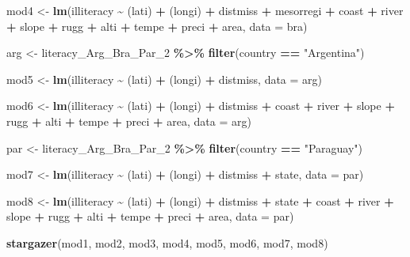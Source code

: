 \documentclass[
  a4paper,
]{article}
\newenvironment{Shaded}{\begin{snugshade}}{\end{snugshade}}
\newcommand{\AttributeTok}[1]{\textcolor[rgb]{0.13,0.29,0.53}{#1}}
\newcommand{\FunctionTok}[1]{\textcolor[rgb]{0.13,0.29,0.53}{\textbf{#1}}}
\newcommand{\NormalTok}[1]{#1}
\newcommand{\OtherTok}[1]{\textcolor[rgb]{0.56,0.35,0.01}{#1}}
\newcommand{\SpecialCharTok}[1]{\textcolor[rgb]{0.81,0.36,0.00}{\textbf{#1}}}
\newcommand{\StringTok}[1]{\textcolor[rgb]{0.31,0.60,0.02}{#1}}
\begin{document}
\begin{Shaded}
\begin{Highlighting}[]
\NormalTok{mod4 }\OtherTok{\textless{}{-}} \FunctionTok{lm}\NormalTok{(illiteracy }\SpecialCharTok{\textasciitilde{}}\NormalTok{ (lati) }\SpecialCharTok{+}\NormalTok{ (longi) }\SpecialCharTok{+}\NormalTok{ distmiss }\SpecialCharTok{+}\NormalTok{ mesorregi }\SpecialCharTok{+}\NormalTok{ coast }\SpecialCharTok{+}\NormalTok{ river }\SpecialCharTok{+}\NormalTok{ slope }\SpecialCharTok{+}\NormalTok{ rugg }\SpecialCharTok{+}\NormalTok{ alti }\SpecialCharTok{+}\NormalTok{ tempe }\SpecialCharTok{+}\NormalTok{ preci }\SpecialCharTok{+}\NormalTok{ area, }\AttributeTok{data =}\NormalTok{ bra)}


\NormalTok{arg }\OtherTok{\textless{}{-}}\NormalTok{ literacy\_Arg\_Bra\_Par\_2 }\SpecialCharTok{\%\textgreater{}\%} 
             \FunctionTok{filter}\NormalTok{(country }\SpecialCharTok{==} \StringTok{"Argentina"}\NormalTok{)}

\NormalTok{mod5 }\OtherTok{\textless{}{-}} \FunctionTok{lm}\NormalTok{(illiteracy }\SpecialCharTok{\textasciitilde{}}\NormalTok{ (lati) }\SpecialCharTok{+}\NormalTok{ (longi) }\SpecialCharTok{+}\NormalTok{ distmiss, }\AttributeTok{data =}\NormalTok{ arg)}

\NormalTok{mod6 }\OtherTok{\textless{}{-}} \FunctionTok{lm}\NormalTok{(illiteracy }\SpecialCharTok{\textasciitilde{}}\NormalTok{ (lati) }\SpecialCharTok{+}\NormalTok{ (longi) }\SpecialCharTok{+}\NormalTok{ distmiss }\SpecialCharTok{+}\NormalTok{ coast }\SpecialCharTok{+}\NormalTok{ river }\SpecialCharTok{+}\NormalTok{ slope }\SpecialCharTok{+}\NormalTok{ rugg }\SpecialCharTok{+}\NormalTok{ alti }\SpecialCharTok{+}\NormalTok{ tempe }\SpecialCharTok{+}\NormalTok{ preci }\SpecialCharTok{+}\NormalTok{ area, }\AttributeTok{data =}\NormalTok{ arg)}


\NormalTok{par }\OtherTok{\textless{}{-}}\NormalTok{ literacy\_Arg\_Bra\_Par\_2 }\SpecialCharTok{\%\textgreater{}\%} 
             \FunctionTok{filter}\NormalTok{(country }\SpecialCharTok{==} \StringTok{"Paraguay"}\NormalTok{)}

\NormalTok{mod7 }\OtherTok{\textless{}{-}} \FunctionTok{lm}\NormalTok{(illiteracy }\SpecialCharTok{\textasciitilde{}}\NormalTok{ (lati) }\SpecialCharTok{+}\NormalTok{ (longi) }\SpecialCharTok{+}\NormalTok{ distmiss }\SpecialCharTok{+}\NormalTok{ state, }\AttributeTok{data =}\NormalTok{ par)}

\NormalTok{mod8 }\OtherTok{\textless{}{-}} \FunctionTok{lm}\NormalTok{(illiteracy }\SpecialCharTok{\textasciitilde{}}\NormalTok{ (lati) }\SpecialCharTok{+}\NormalTok{ (longi) }\SpecialCharTok{+}\NormalTok{ distmiss }\SpecialCharTok{+}\NormalTok{ state }\SpecialCharTok{+}\NormalTok{ coast }\SpecialCharTok{+}\NormalTok{ river }\SpecialCharTok{+}\NormalTok{ slope }\SpecialCharTok{+}\NormalTok{ rugg }\SpecialCharTok{+}\NormalTok{ alti }\SpecialCharTok{+}\NormalTok{ tempe }\SpecialCharTok{+}\NormalTok{ preci }\SpecialCharTok{+}\NormalTok{ area, }\AttributeTok{data =}\NormalTok{ par)}

\FunctionTok{stargazer}\NormalTok{(mod1, mod2, mod3, mod4, mod5, mod6, mod7, mod8)}
\end{Highlighting}
\end{Shaded}
\end{document}
